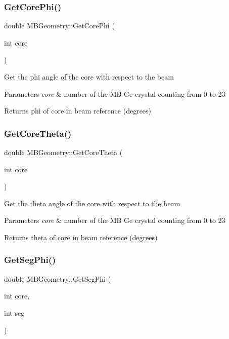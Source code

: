 \subsubsection{\texorpdfstring{Get\+Core\+Phi()}{GetCorePhi()}}
{\footnotesize\ttfamily double M\+B\+Geometry\+::\+Get\+Core\+Phi (\begin{DoxyParamCaption}\item[{int}]{core }\end{DoxyParamCaption})}

Get the phi angle of the core with respect to the beam 
\begin{DoxyParams}{Parameters}
{\em core} & number of the MB Ge crystal counting from 0 to 23 \\
\hline
\end{DoxyParams}
\begin{DoxyReturn}{Returns}
phi of core in beam reference (degrees) 
\end{DoxyReturn}
\mbox{\label{class_m_b_geometry_a42aa536f15017724812712b0f8a77c12}} 
\subsubsection{\texorpdfstring{Get\+Core\+Theta()}{GetCoreTheta()}}
{\footnotesize\ttfamily double M\+B\+Geometry\+::\+Get\+Core\+Theta (\begin{DoxyParamCaption}\item[{int}]{core }\end{DoxyParamCaption})}

Get the theta angle of the core with respect to the beam 
\begin{DoxyParams}{Parameters}
{\em core} & number of the MB Ge crystal counting from 0 to 23 \\
\hline
\end{DoxyParams}
\begin{DoxyReturn}{Returns}
theta of core in beam reference (degrees) 
\end{DoxyReturn}
\mbox{\label{class_m_b_geometry_a575ddd6022d2d686a83ebce3195b6c50}} 
\subsubsection{\texorpdfstring{Get\+Seg\+Phi()}{GetSegPhi()}}
{\footnotesize\ttfamily double M\+B\+Geometry\+::\+Get\+Seg\+Phi (\begin{DoxyParamCaption}\item[{int}]{core,  }\item[{int}]{seg }\end{DoxyParamCaption})}

